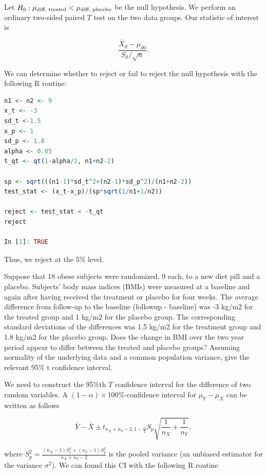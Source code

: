 \documentclass{homework}
\begin{document}
Let $H_0: \mu_{\textnormal{diff, treated}} < \mu_{\textnormal{diff, placebo}}$ be the null hypothesis. We perform an ordinary two-sided paired $T$ test on the two data groups. Our statistic of interest is 

$$
\frac{\bar{X}_d - \mu_{d0}}{S_d/\sqrt{n}}.
$$

We can determine whether to reject or fail to reject the null hypothesis with the following R routine:

\begin{lstlisting}[language=R]
n1 <- n2 <- 9
x_t <- -3
sd_t <-1.5
x_p <- 1
sd_p <- 1.8
alpha <- 0.05
t_qt <- qt(1-alpha/2, n1+n2-2)

sp <- sqrt(((n1-1)*sd_t^2+(n2-1)*sd_p^2)/(n1+n2-2))
test_stat <- (x_t-x_p)/(sp*sqrt(1/n1+1/n2))

reject <- test_stat < -t_qt
reject

In [1]: TRUE
\end{lstlisting}

Thus, we reject at the 5\% level. \\

\begin{tcolorbox}[title=Question 6]
Suppose that 18 obese subjects were randomized, 9 each, to a new diet pill and a placebo. Subjects’ body mass indices (BMIs) were measured at a baseline and again after having received the treatment or placebo for four weeks. The average difference from follow-up to the baseline (followup - baseline) was -3 kg/m2 for the treated group and 1 kg/m2 for the placebo group. The corresponding standard deviations of the differences was 1.5 kg/m2 for the treatment group and 1.8 kg/m2 for the placebo group. Does the change in BMI over the two year period appear to differ between the treated and placebo groups?  Assuming normality of the underlying data and a common population variance, give the relevant 95\% t confidence interval.
\end{tcolorbox}

We need to construct the 95\%th $T$ confidence interval for the difference of two random variables. A $(1-\alpha)\times 100\%$-confidence interval for $\mu_Y-\mu_X$ can be written as follows

$$
\bar{Y}-\bar{X}\pm t_{n_{X}+n_{Y}-2,1-\frac{\alpha}{2}}S_p \sqrt{\frac{1}{n_X}+\frac{1}{n_Y}},
$$

where $S_p^2 = \frac{(n_X-1)S_x^2 + (n_Y-1)S_y^2 }{n_X+n_Y-2}$ is the pooled variance (an unbiased estimator for the variance $\sigma^2$). We can found this CI with the following R routine
\end{document}
